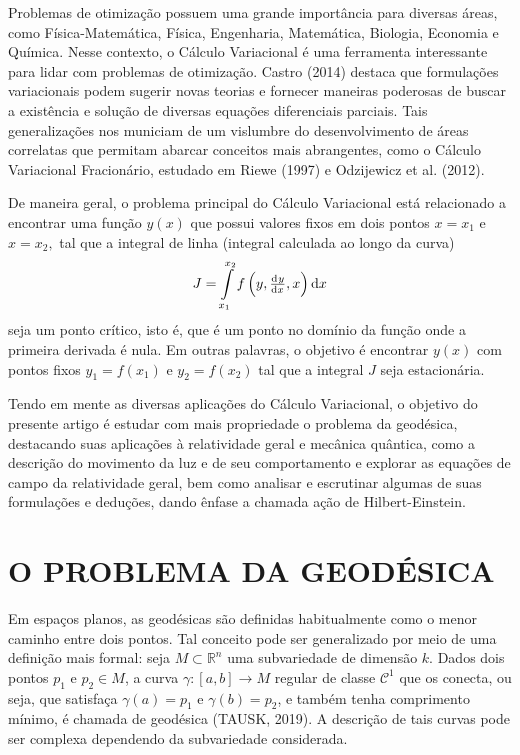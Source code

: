 \documentclass[a4,11pt]{report}
\begin{document}
Problemas de otimização possuem uma grande importância para diversas áreas, como Física-Matemática, Física, Engenharia, Matemática, Biologia, Economia e Química. Nesse contexto, o Cálculo Variacional é uma ferramenta interessante para lidar com problemas de otimização. Castro (2014) destaca que formulações variacionais podem sugerir novas teorias e fornecer maneiras poderosas de buscar a existência e solução de diversas equações diferenciais parciais. Tais generalizações nos municiam de um vislumbre do desenvolvimento de áreas correlatas que permitam abarcar conceitos mais abrangentes, como o Cálculo Variacional Fracionário, estudado em Riewe (1997) e Odzijewicz et al. (2012).

De maneira geral, o problema principal do Cálculo Variacional está relacionado a encontrar uma função $y(x)$ que possui valores fixos em dois pontos $x = x_1$
e $x = x_2,$ tal que a integral de linha (integral calculada ao longo da curva) 
\[
J = \int\limits_{x_1}^{x_2} f\left(y, \od{y}{x}, x\right) \dif x\]
seja um ponto crítico, isto é, que é um ponto no domínio da função onde a primeira derivada é nula. Em outras palavras, o objetivo é encontrar $y(x)$ com pontos fixos $y_1 = f(x_1)$ e $y_2 = f(x_2)$ tal que a integral $J$ seja estacionária.

Tendo em mente as diversas aplicações do Cálculo Variacional, o objetivo do presente artigo é estudar com mais propriedade o problema da geodésica, destacando suas aplicações à relatividade geral e mecânica quântica, como a descrição do movimento da luz e de seu comportamento e explorar as equações de campo da relatividade geral, bem como analisar e escrutinar algumas de suas formulações e deduções, dando ênfase a chamada ação de Hilbert-Einstein. 

\section{O PROBLEMA DA GEODÉSICA}

Em espaços planos, as geodésicas são definidas habitualmente como o menor caminho entre dois pontos. Tal conceito pode ser generalizado por meio de uma definição mais formal: seja $M \subset \mathbb{R}^n$ uma subvariedade de dimensão $k$. Dados dois pontos $p_1$ e $p_2 \in M$, a curva $\gamma:[a, b] \rightarrow M$ regular de classe $\mathcal{C}^1$ que os conecta, ou seja, que satisfaça $\gamma(a) = p_1$ e $\gamma(b) = p_2$, e também tenha comprimento mínimo, é chamada de geodésica (TAUSK, 2019). A descrição de tais curvas pode ser complexa dependendo da subvariedade considerada.
\end{document}
